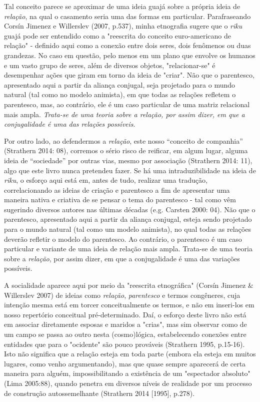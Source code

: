 Tal conceito parece se aproximar de uma ideia guajá sobre a própria
ideia de \emph{relação}, na qual o casamento seria uma das formas em
particular. Parafraseando Corsín Jimenez e Willerslev (2007, p.537),
minha etnografia sugere que o \emph{riku} guajá pode ser entendido como
a "reescrita do conceito euro-americano de relação" - definido aqui como
a conexão entre dois seres, dois fenômenos ou duas grandezas. No caso em
questão, pelo menos em um plano que envolve os humanos e um vasto grupo
de seres, além de diversos objetos, "relacionar-se" é desempenhar ações
que giram em torno da ideia de "criar". Não que o parentesco,
apresentado aqui a partir da aliança conjugal, seja projetado para o
mundo natural (tal como no modelo animista), em que todas as relações
refletem o parentesco, mas, ao contrário, ele é um caso particular de
uma matriz relacional mais ampla. \emph{Trata-se de uma teoria sobre a
relação, por assim dizer, em que a conjugalidade é uma das relações
possíveis}.

Por outro lado, ao defendermos a \emph{relação}, este nosso ``conceito
de companhia'' (Strathern 2014: 08), corremos o sério risco de reificar,
em algum lugar, alguma ideia de ``sociedade'' por outras vias, mesmo por
associação (Strathern 2014: 11), algo que este livro nunca pretendeu
fazer. Se há uma intraduzibilidade na ideia de \emph{riku}, o esforço
aqui está em, antes de tudo, realizar uma tradução, correlacionando as
ideias de criação e parentesco a fim de apresentar uma maneira nativa e
criativa de se pensar o tema do parentesco - tal como vêm sugerindo
diversos autores nas últimas décadas (e.g. Carsten 2000: 04). Não que o
parentesco, apresentado aqui a partir da aliança conjugal, esteja sendo
projetado para o mundo natural (tal como um modelo animista), no qual
todas as relações deverão refletir o modelo do parentesco. Ao contrário,
o parentesco é um caso particular e variante de uma ideia de relação
mais ampla. Trata-se de uma teoria sobre a \emph{relação}, por assim
dizer, em que a conjugalidade é uma das variações possíveis.

A socialidade aparece aqui por meio da "reescrita etnográfica" (Corsín
Jimenez \& Willerslev 2007) de ideias como \emph{relação},
\emph{parentesco} e termos congêneres, cuja intenção mesma está em
torcer conceitualmente os termos, e não em inseri-los em nosso
repertório conceitual pré-determinado. Daí, o esforço deste livro não
está em associar diretamente esposas e maridos a "crias", mas sim
observar como de um campo se passa ao outro nesta (cosmo)lógica,
estabelecendo conexões entre entidades que para o "ocidente" são pouco
prováveis (Strathern 1995, p.15-16). Isto não significa que a relação
esteja em toda parte (embora ela esteja em muitos lugares, como venho
argumentando), mas que quase sempre aparecerá de certa maneira para
alguém, impossibilitando a existência de um "espectador absoluto" (Lima
2005:88), quando penetra em diversos níveis de realidade por um processo
de construção autossemelhante (Strathern 2014 {[}1995{]}, p.278).

